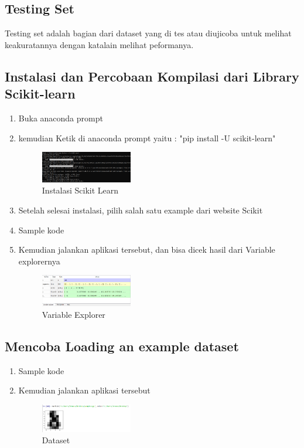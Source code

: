 	\subsection{Testing Set}
	Testing set adalah bagian dari dataset yang di tes atau diujicoba untuk melihat keakuratannya dengan katalain melihat peformanya.
	
	\subsection{Instalasi dan Percobaan Kompilasi dari Library Scikit-learn}
	\begin{enumerate}
		\item Buka anaconda prompt
		\item kemudian Ketik di anaconda prompt yaitu : "pip install -U scikit-learn" \break
		\begin{figure}[H]
			\includegraphics[width=4cm]{figures/1174043/chapter1/1.png}
			\centering
			\caption{Instalasi Scikit Learn}
		\end{figure}
		\item Setelah selesai instalasi, pilih salah satu example dari website Scikit
		\item Sample kode \break 
		\item Kemudian jalankan aplikasi tersebut, dan bisa dicek hasil dari Variable explorernya \break
		\begin{figure}[H]
			\includegraphics[width=4cm]{figures/1174043/chapter1/hasil_sample.png}
			\centering
			\caption{Variable Explorer}
		\end{figure}
	\end{enumerate}
	
	\subsection{Mencoba Loading an example dataset}
	\begin{enumerate}
		\item Sample kode \break 
		\item Kemudian jalankan aplikasi tersebut \break
		\begin{figure}[H]
			\includegraphics[width=4cm]{figures/1174043/chapter1/hasil_dataset.png}
			\centering
			\caption{Dataset}
		\end{figure}
	\end{enumerate}